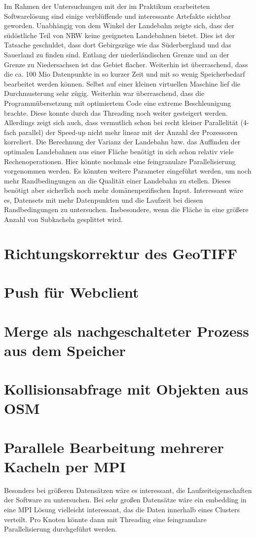 \documentclass[10pt,a4paper]{report}
\begin{document}
Im Rahmen der Untersuchungen mit der im Praktikum erarbeiteten Softwarelösung sind einige verblüffende und interessante Artefakte sichtbar geworden.
Unabhängig von dem Winkel der Landebahn zeigte sich, dass der südöstliche Teil von NRW keine geeigneten Landebahnen bietet. Dies ist der Tatsache geschuldet, dass dort Gebirgszüge wie das Süderbergland und das Sauerland zu finden sind.
Entlang der niederländischen Grenze und an der Grenze zu Niedersachsen ist das Gebiet flacher.
Weiterhin ist überraschend, dass die ca. 100 Mio Datenpunkte in so kurzer Zeit und mit so wenig Speicherbedarf bearbeitet werden können. Selbst auf einer kleinen virtuellen Maschine lief die Durchmusterung sehr zügig.
Weiterhin war überraschend, dass die Programmübersetzung mit optimiertem Code eine extreme Beschleunigung brachte.
Diese konnte durch das Threading noch weiter gesteigert werden.
Allerdings zeigt sich auch, dass vermutlich schon bei recht kleiner Parallelität (4-fach parallel) der Speed-up nicht mehr linear mit der Anzahl der Prozessoren korreliert.
Die Berechnung der Varianz der Landebahn bzw. das Auffinden der optimalen Landebahnen aus einer Fläche benötigt in sich schon relativ viele Rechenoperationen. Hier könnte nochmals eine feingranulare Parallelisierung vorgenommen werden.
Es könnten weitere Parameter eingeführt werden, um noch mehr Randbedingungen an die Qualität einer Landebahn zu stellen. Dieses benötigt aber sicherlich noch mehr domänenpezifischen Input.
Interessant wäre es, Datensets mit mehr Datenpunkten und die Laufzeit bei diesen Randbedingungen zu untersuchen. Insbesondere, wenn die Fläche in eine größere Anzahl von Subkacheln gesplittet wird.
 
\section{Richtungskorrektur des GeoTIFF}
\section{Push für Webclient}
\section{Merge als nachgeschalteter Prozess aus dem Speicher}
\section{Kollisionsabfrage mit Objekten aus OSM}
\section{Parallele Bearbeitung mehrerer Kacheln per MPI}
Besonders bei größeren Datensätzen wäre es interessant, die Laufzeiteigenschaften der Software zu untersuchen. Bei sehr großen Datensätze wäre ein embedding in eine MPI Lösung vielleicht interessant, das die Daten innerhalb eines Clusters verteilt. Pro Knoten könnte dann mit Threading eine feingranulare Parallelisierung durchgeführt werden.
\end{document}
